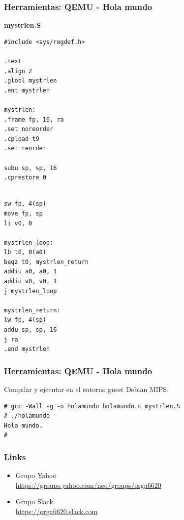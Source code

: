 \documentclass{beamer}
\begin{document}
  \begin{frame}[fragile]
 \frametitle{Herramientas: QEMU - Hola mundo}
 \textbf{mystrlen.S}

\begin{multicols}{2}
\begin{lstlisting}
#include <sys/regdef.h>

.text
.align 2
.globl mystrlen
.ent mystrlen

mystrlen:
.frame fp, 16, ra
.set noreorder
.cpload t9
.set reorder

subu sp, sp, 16
.cprestore 0


\end{lstlisting}

\columnbreak
\begin{lstlisting}
sw fp, 4(sp)
move fp, sp
li v0, 0

mystrlen_loop:
lb t0, 0(a0)
beqz t0, mystrlen_return
addiu a0, a0, 1
addiu v0, v0, 1
j mystrlen_loop

mystrlen_return:
lw fp, 4(sp)
addu sp, sp, 16
j ra
.end mystrlen
\end{lstlisting}
\end{multicols}
\end{frame}

  \begin{frame}[fragile]
 \frametitle{Herramientas: QEMU - Hola mundo} 
Compilar y ejecutar en el entorno guest Debian MIPS.

\begin{lstlisting}
# gcc -Wall -g -o holamundo holamundo.c mystrlen.S 
# ./holamundo 
Hola mundo.
# 
\end{lstlisting}
\end{frame}

\begin{frame}
 \frametitle{Links}
 \begin{itemize}
\item Grupo Yahoo \\ \url{https://groups.yahoo.com/neo/groups/orga6620}
\item Grupo Slack \\ \url{https://orga6620.slack.com}
 \end{itemize}
 \end{frame}
\end{document}
